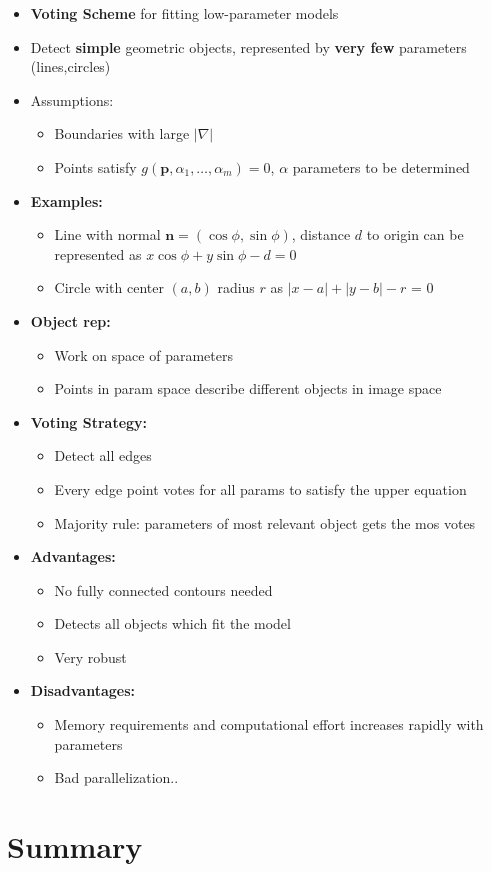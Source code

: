\begin{itemize}
    \item \textbf{Voting Scheme} for fitting low-parameter models
    \item Detect \textbf{simple} geometric objects, represented by \textbf{very few} parameters (lines,circles)
    \item Assumptions: {\begin{itemize}
        \item Boundaries with large $|\nabla|$
        \item Points satisfy $g(\mathbf{p}, \alpha_1, \dots, \alpha_m) = 0$, $\alpha$ parameters to be determined
    \end{itemize}}
    \item \textbf{Examples:} {\begin{itemize}
        \item Line with normal $\mathbf{n} = (\cos \phi, \sin \phi)$, distance $d$ to origin can be represented as $x\cos \phi + y\sin \phi - d = 0$
        \item Circle with center $(a,b)$ radius $r$ as $|x-a| + |y-b| - r$ = 0
    \end{itemize}}
    \item \textbf{Object rep:} {\begin{itemize}
        \item Work on space of parameters
        \item Points in param space describe different objects in image space
    \end{itemize}}
    \item \textbf{Voting Strategy:} {\begin{itemize}
        \item Detect all edges
        \item Every edge point votes for all params to satisfy the upper equation
        \item Majority rule: parameters of most relevant object gets the mos votes
    \end{itemize}}
    \item \textbf{Advantages:} {\begin{itemize}
        \item No fully connected contours needed
        \item Detects all objects which fit the model
        \item Very robust
    \end{itemize}}
    \item \textbf{Disadvantages:} {\begin{itemize}
        \item Memory requirements and computational effort increases rapidly with parameters
        \item Bad parallelization..
    \end{itemize}}
\end{itemize}

\section{Summary}